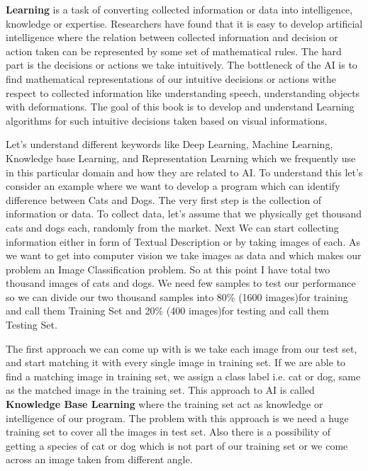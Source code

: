 \documentclass[a4paper]{article}
\begin{document}
\textbf{Learning} is a task of converting collected information or data into intelligence, knowledge or expertise. Researchers have found that it is easy to develop artificial intelligence where the relation between collected information and decision or action taken can be represented by some set of mathematical rules. The hard part is the decisions or actions we take intuitively. The bottleneck of the AI is to find mathematical representations of our intuitive decisions or actions withe respect to collected information like understanding speech, understanding objects with deformations. The goal of this book is to develop and understand Learning algorithms for such intuitive decisions taken based on visual informations. 

Let's understand different keywords like Deep Learning, Machine Learning, Knowledge base Learning, and Representation Learning which we frequently use in this particular domain and how they are related to AI. To understand this let's consider an example where we want to develop a program which can identify difference between Cats and Dogs. The very first step is the collection of information or data. To collect data, let's assume that we physically get thousand cats and dogs each, randomly from the market. Next We can start collecting information either in form of Textual Description or by taking images of each. As we want to get into computer vision we take images as data and which makes our problem an Image Classification problem. So at this point I have total two thousand images of cats and dogs. We need few samples to test our performance so we can divide our two thousand samples into 80\% (1600 images)for training and call them Training Set and 20\% (400 images)for testing and call them Testing Set. 

The first approach we can come up with is we take each image from our test set, and start matching it with every single image in training set. If we are able to find a matching image in training set, we assign a class label i.e. cat or dog, same as the matched image in the training set. This approach to AI is called \textbf{Knowledge Base Learning} where the training set act as knowledge or intelligence of our program. The problem with this approach is we need a huge training set to cover all the images in test set. Also there is a possibility of getting a species of cat or dog which is not part of our training set or we come across an image taken from different angle. 
\end{document}
